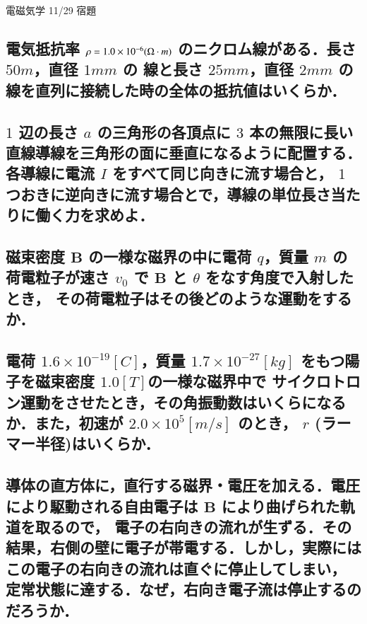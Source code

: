 \documentclass[a4paper, 12pt]{bxjsarticle}
\begin{document}
\begin{center}
    \begin{huge}
        電磁気学 11/29 宿題
    \end{huge}
\end{center}

\subsection{電気抵抗率 \(\rho = 1.0\times10^{-6}\si(\Omega \cdot m)\) のニクロム線がある．長さ \(50\si{m}\)，直径 \(1\si{mm}\) の%
線と長さ \(25\si{mm}\)，直径 \(2\si{mm}\) の線を直列に接続した時の全体の抵抗値はいくらか．}
\vspace{20em}

\subsection{\(1\) 辺の長さ \(a\) の三角形の各頂点に \(3\) 本の無限に長い直線導線を三角形の面に垂直になるように配置する．各導線に電流 \(I\) をすべて同じ向きに流す場合と，%
\(1\) つおきに逆向きに流す場合とで，導線の単位長さ当たりに働く力を求めよ．}

\newpage
\subsection{磁束密度 \(\boldsymbol{B}\) の一様な磁界の中に電荷 \(q\)，質量 \(m\) の荷電粒子が速さ \(v_0\) で \(\boldsymbol{B}\) と \(\theta\) をなす角度で入射したとき，%
その荷電粒子はその後どのような運動をするか．}
\vspace{20em}

\subsection{電荷 \(1.6\times10^{-19}\si{[C]}\)，質量 \(1.7\times10^{-27}\si{[kg]}\) をもつ陽子を磁束密度 \(1.0\si{[T]}\)の一様な磁界中で%
サイクロトロン運動をさせたとき，その角振動数はいくらになるか．また，初速が \(2.0\times10^{5}\si{[m/s]}\) のとき，%
\(r\) (ラーマー半径)はいくらか．}
\newpage

\subsection{導体の直方体に，直行する磁界・電圧を加える．電圧により駆動される自由電子は \(\boldsymbol{B}\) により曲げられた軌道を取るので，%
電子の右向きの流れが生ずる．その結果，右側の壁に電子が帯電する．しかし，実際にはこの電子の右向きの流れは直ぐに停止してしまい，%
定常状態に達する．なぜ，右向き電子流は停止するのだろうか．}
\end{document}
